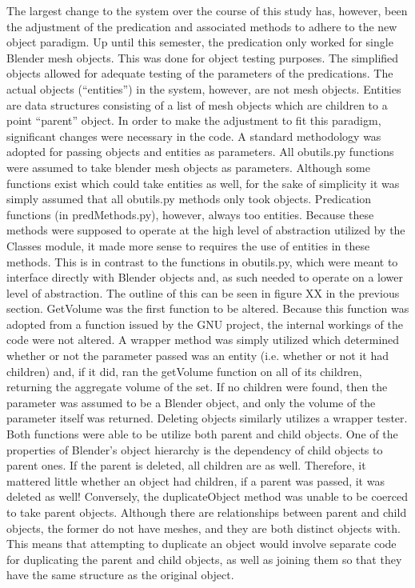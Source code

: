 The largest change to the system over the course of this study has, however, been the adjustment of the predication and associated methods to adhere to the new object paradigm. Up until this semester, the predication only worked for single Blender mesh objects. This was done for object testing purposes. The simplified objects allowed for adequate testing of the parameters of the predications. The actual objects (“entities”) in the system, however, are not mesh objects. Entities are data structures consisting of a list of mesh objects which are children to a point “parent” object. In order to make the adjustment to fit this paradigm, significant changes were necessary in the code. A standard methodology was adopted for passing objects and entities as parameters. All obutils.py functions were assumed to take blender mesh objects as parameters. Although some functions exist which could take entities as well, for the sake of simplicity it was simply assumed that all obutils.py methods only took objects. 
Predication functions (in predMethods.py), however, always too entities. Because these methods were supposed to operate at the high level of abstraction utilized by the Classes module, it made more sense to requires the use of entities in these methods. This is in contrast to the functions in obutils.py, which were meant to interface directly with Blender objects and, as such needed to operate on a lower level of abstraction. The outline of this can be seen in figure XX in the previous section.
GetVolume was the first function to be altered. Because this function was adopted from a function issued by the GNU project, the internal workings of the code were not altered. A wrapper method was simply utilized which determined whether or not the parameter passed was an entity (i.e. whether or not it had children) and, if it did, ran the getVolume function on all of its children, returning the aggregate volume of the set. If no children were found, then the parameter was assumed to be a Blender object, and only the volume of the parameter itself was returned.
Deleting objects similarly utilizes a wrapper tester. Both functions were able to be utilize both parent and child objects. One of the properties of Blender's object hierarchy is the dependency of child objects to parent ones. If the parent is deleted, all children are as well. Therefore, it mattered little whether an object had children, if a parent was passed, it was deleted as well!
Conversely, the duplicateObject method was unable to be coerced to take parent objects. Although there are relationships between parent and child objects, the former do not have meshes, and they are both distinct objects with. This means that attempting to duplicate an object would involve separate code for duplicating the parent and child objects, as well as joining them so that they have the same structure as the original object. 
